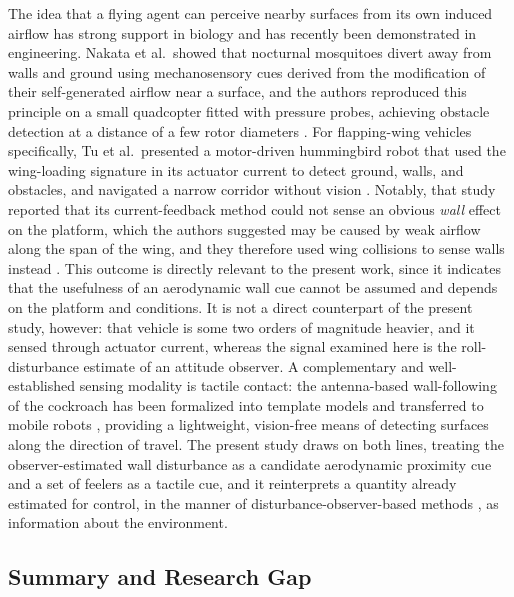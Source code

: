 \documentclass[final,5p,times]{elsarticle}
\begin{document}
The idea that a flying agent can perceive nearby surfaces from its own induced airflow has strong support in biology and has recently been demonstrated in engineering. Nakata et al.\ showed that nocturnal mosquitoes divert away from walls and ground using mechanosensory cues derived from the modification of their self-generated airflow near a surface, and the authors reproduced this principle on a small quadcopter fitted with pressure probes, achieving obstacle detection at a distance of a few rotor diameters \cite{nakata2020aerodynamic}. For flapping-wing vehicles specifically, Tu et al.\ presented a motor-driven hummingbird robot that used the wing-loading signature in its actuator current to detect ground, walls, and obstacles, and navigated a narrow corridor without vision \cite{tu2019acting}. Notably, that study reported that its current-feedback method could not sense an obvious \emph{wall} effect on the platform, which the authors suggested may be caused by weak airflow along the span of the wing, and they therefore used wing collisions to sense walls instead \cite{tu2019acting}. This outcome is directly relevant to the present work, since it indicates that the usefulness of an aerodynamic wall cue cannot be assumed and depends on the platform and conditions. It is not a direct counterpart of the present study, however: that vehicle is some two orders of magnitude heavier, and it sensed through actuator current, whereas the signal examined here is the roll-disturbance estimate of an attitude observer. A complementary and well-established sensing modality is tactile contact: the antenna-based wall-following of the cockroach has been formalized into template models and transferred to mobile robots \cite{lee2008templates}, providing a lightweight, vision-free means of detecting surfaces along the direction of travel. The present study draws on both lines, treating the observer-estimated wall disturbance as a candidate aerodynamic proximity cue and a set of feelers as a tactile cue, and it reinterprets a quantity already estimated for control, in the manner of disturbance-observer-based methods \cite{chen2015disturbance}, as information about the environment.

\subsection{Summary and Research Gap}
\label{sec:rw_gap}
\end{document}
